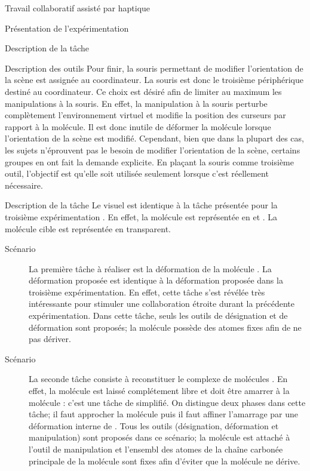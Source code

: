 \documentclass[myfrancais,ngerman,english,frenchb]{mythesis}
\begin{document}
\begin{mychapter}{Travail collaboratif assisté par haptique}
\begin{mysection}{Présentation de l'expérimentation}
\begin{mysubsection}{Description de la tâche}
\begin{mysubsubsection}{Description des outils}
					Pour finir, la souris permettant de modifier l'orientation de la scène est assignée au coordinateur.
					La souris est donc le troisième périphérique destiné au coordinateur.
					Ce choix est désiré afin de limiter au maximum les manipulations à la souris.
					En effet, la manipulation à la souris perturbe complètement l'environnement virtuel et modifie la position des curseurs par rapport à la molécule.
					Il est donc inutile de déformer la molécule lorsque l'orientation de la scène est modifié.
					Cependant, bien que dans la plupart des cas, les sujets n'éprouvent pas le besoin de modifier l'orientation de la scène, certains groupes en ont fait la demande explicite.
					En plaçant la souris comme troisième outil, l'objectif est qu'elle soit utilisée seulement lorsque c'est réellement nécessaire.
				\end{mysubsubsection}
				\begin{mysubsubsection}{Description de la tâche}
					Le visuel est identique à la tâche présentée pour la troisième expérimentation .
					En effet, la molécule est représentée en \myCPK et \myNewRibbon.
					La molécule cible est représentée en \myNewRibbon transparent.
					\begin{description}
						\item[Scénario~]
							La première tâche à réaliser est la déformation de la molécule \myUbiquitin.
							La déformation proposée est identique à la déformation proposée dans la troisième expérimentation.
							En effet, cette tâche s'est révélée très intéressante pour stimuler une collaboration étroite durant la précédente expérimentation.
							Dans cette tâche, seuls les outils de désignation et de déformation sont proposés; la molécule \myUbiquitin possède des atomes fixes afin de ne pas dériver.
						\item[Scénario~]
							La seconde tâche consiste à reconstituer le complexe de molécules \myNusENusG.
							En effet, la molécule \myNusG est laissé complétement libre et doit être amarrer à la molécule \myNusE : c'est une tâche de  simplifié.
							On distingue deux phases dans cette tâche; il faut approcher la molécule \myNusG puis il faut affiner l'amarrage par une déformation interne de \myNusG.
							Tous les outils (désignation, déformation et manipulation) sont proposés dans ce scénario; la molécule \myNusG est attaché à l'outil de manipulation et l'ensembl des atomes de la chaîne carbonée principale de la molécule \myNusE sont fixes afin d'éviter que la molécule ne dérive.
					\end{description}


\end{mysubsubsection}
\end{mysubsection}
\end{mysection}
\end{mychapter}
\end{document}
